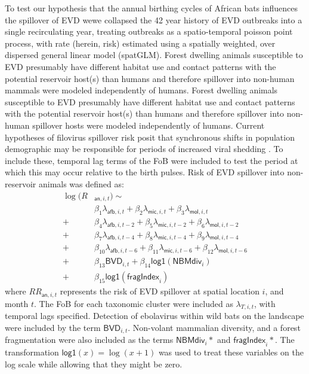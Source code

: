 \documentclass[9pt,twoside,lineno]{pnas-new}
\newcommand{\afb}{\mathsf{afb}}
\newcommand{\mic}{\mathsf{mic}}
\newcommand{\mol}{\mathsf{mol}}
\newcommand{\logplus}{\mathsf{log1}}
\begin{document}
To test our hypothesis that the annual birthing cycles of African bats influences the spillover of EVD wewe collapsed the 42 year history of EVD outbreaks into a single recirculating year, treating outbreaks as a spatio-temporal poisson point process, with rate (herein, risk) estimated using a spatially weighted, over dispersed general linear model (spatGLM). Forest dwelling animals susceptible to EVD presumably have different habitat use and contact patterns with the potential reservoir host(s) than humans and therefore spillover into non-human mammals were modeled independently of humans. Forest dwelling animals susceptible to EVD presumably have different habitat use and contact patterns with the potential reservoir host(s) than humans and therefore spillover into non-human spillover hosts were modeled independently of humans. Current hypotheses of filovirus spillover risk posit that synchronous shifts in population demographic may be responsible for periods of increased viral shedding \cite{Hayman2015BiannualPopulations, Pourrut2009LargeAegyptiacus.}. To include these, temporal lag terms of the FoB were included to test the period at which this may occur relative to the birth pulses. Risk of EVD spillover into non-reservoir animals was defined as:
\[
\begin{split}
    \log(R& _{\mathsf{an}, i, t}) \sim \\
    & \beta_1 \lambda_{\afb, i, t} + \beta_2 \lambda_{\mic, i, t} + \beta_3 \lambda_{\mol, i, t} \\
 + &\beta_4 \lambda_{\afb, i, t-2} + \beta_5 \lambda_{\mic, i, t-2} + \beta_6 \lambda_{\mol, i, t-2} \\
 + &\beta_7 \lambda_{\afb, i, t-4} + \beta_8 \lambda_{\mic, i, t-4} + \beta_9 \lambda_{\mol, i, t-4} \\
 + &\beta_{10} \lambda_{\afb, i, t-6} + \beta_{11} \lambda_{\mic, i, t-6} + \beta_{12} \lambda_{\mol, i, t-6} \\
 +&\beta_{13} \mathsf{BVD}_{i,t} +  \beta_{14} \logplus(\mathsf{NBM div}_{i})\\
 + &\beta_{15} \logplus(\mathsf{fragIndex}_{i}) 
\end{split}
\]
where $RR_{\mathsf{an}, i, t}$ represents the risk of EVD spillover at spatial location $i$, and month $t$. The FoB for each taxonomic cluster were included as $\lambda_{T, i, t}$, with temporal lags specified. Detection of ebolavirus within wild bats on the landscape were included by the term $\mathsf{BVD}_{i,t}$. Non-volant mammalian diversity, and a forest fragmentation were also included as the terms $\mathsf{NBM div}_{i}*$ and $\mathsf{fragIndex}_{i}*$. The transformation $\logplus(x) = \log(x + 1)$ was used to treat these variables on the log scale while allowing that they might be zero.
\end{document}

